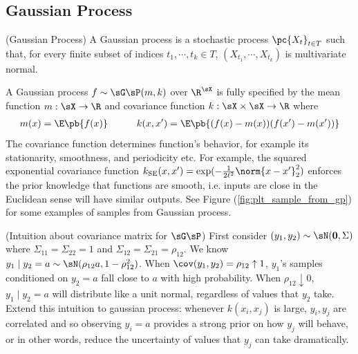\documentclass[11pt]{article}
\begin{document}
\subsection{Gaussian Process}


\begin{definition}
    (Gaussian Process) A Gaussian process is a stochastic process $\pc{X_t}_{t\in T}$ such that, for every finite subset of indices $t_1,\cdots,t_k \in T$, $(X_{t_1},\cdots,X_{t_k})$ is multivariate normal.
\end{definition}

A Gaussian process $f\sim \sG\sP(m,k)$ over $\R^{\sX}$ is fully specified by the mean function $m:\sX\to\R$ and covariance function $k:\sX\times\sX\to\R$ where
\begin{align}
    m(x)=\E\pb{f(x)}
    \quad\quad\quad
    k(x,x') = \E\pb{ (f(x)-m(x))(f(x')-m(x')) }
\end{align}
The covariance function determines function's behavior, for example its stationarity, smoothness, and periodicity etc. For example, the squared exponential covariance function $k_{\text{SE}}(x,x') = \exp( -\frac{1}{2\ell^2} \norm{x-x'}_2^2 )$ enforces the prior knowledge that functions are smooth, i.e. inputs are close in the Euclidean sense will have similar outputs. See Figure (\ref{fig:plt_sample_from_gp}) for some examples of samples from Gaussian process.

\begin{example}
    (Intuition about covariance matrix for $\sG\sP$) First consider $(y_1,y_2) \sim \sN(\mathbf{0}, \Sigma)$ where $\Sigma_{11}=\Sigma_{22} = 1$ and $\Sigma_{12}=\Sigma_{21}=\rho_{12}$. We know $y_1\mid y_2 = a \sim \sN(\rho_{12} a, 1 -  \rho_{12}^2)$. When $\cov(y_1,y_2) = \rho_{12} \uparrow 1$, $y_1$'s samples conditioned on $y_2=a$ fall close to $a$ with high probability. When $\rho_{12} \downarrow 0$, $y_1 \mid y_2=a$ will distribute like a unit normal, regardless of values that $y_2$ take. Extend this intuition to gaussian process: whenever $k(x_i,x_j)$ is large, $y_i,y_j$ are correlated and so observing $y_i=a$ provides a strong prior on how $y_j$ will behave, or in other words, reduce the uncertainty of values that $y_j$ can take dramatically.
\end{example}
\end{document}
